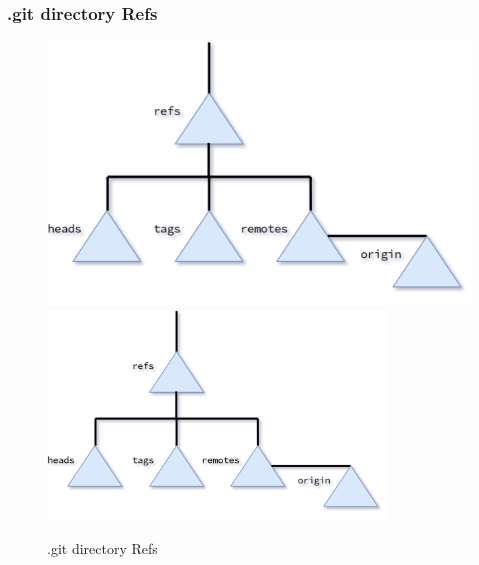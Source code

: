 \begin{frame}[fragile]
    \frametitle{.git directory Refs}
    \begin{figure}
        \begin{center}
            {
                \includegraphics[height=0.75\textheight,keepaspectratio]{./images/gitDirectory-Refs.png}
            }
            {
                \includegraphics[height=0.75\textheight,width=0.8\textwidth]{./images/gitDirectory-Refs.png}
            }
            \caption{.git directory Refs}
        \end{center}
    \end{figure}
\end{frame}


